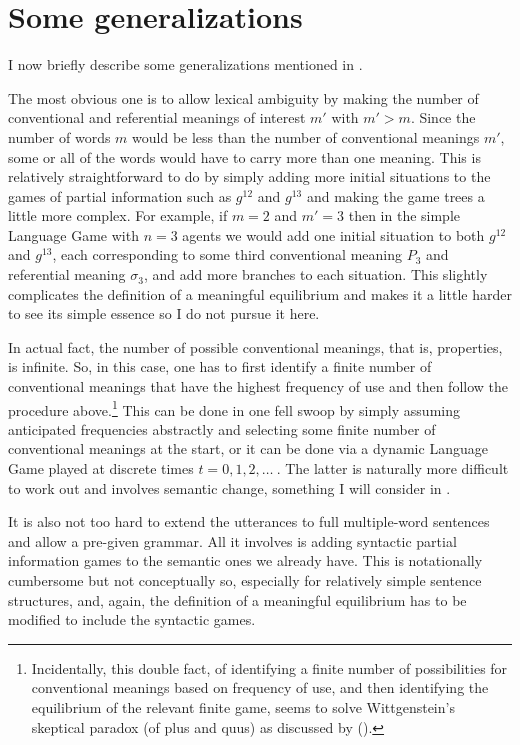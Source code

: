 \section{Some generalizations} \label{sec:some generalizations}

I now briefly describe some generalizations mentioned in . 

The most obvious one is to allow lexical ambiguity by making the number of conventional and referential meanings of interest $m'$ with $m' > m$. Since the number of words $m$ would be less than the number of conventional meanings $m'$, some or all of the words would have to carry more than one meaning. This is relatively straightforward to do by simply adding more initial situations to the games of partial information such as $g^{12}$ and $g^{13}$ and making the game trees a little more complex. For example, if $m = 2$ and $m' = 3$ then in the simple Language Game with $n = 3$ agents we would add one initial situation to both $g^{12}$ and $g^{13}$, each corresponding to some third conventional meaning $P_3$ and referential meaning $\sigma_3$, and add more branches to each situation. This slightly complicates the definition of a meaningful equilibrium and makes it a little harder to see its simple essence so I do not pursue it here.

In actual fact, the number of possible conventional meanings, that is, properties, is infinite. So, in this case, one has to first identify a finite number of conventional meanings that have the highest frequency of use and then follow the procedure above.\footnote{Incidentally, this double fact, of identifying a finite number of possibilities for conventional meanings based on frequency of use, and then identifying the equilibrium of the relevant finite game, seems to solve Wittgenstein’s skeptical paradox (of plus and quus) as discussed by \citeauthor{kripke:w} (\citeyear{kripke:w}).} This can be done in one fell swoop by simply assuming anticipated frequencies abstractly and selecting some finite number of conventional meanings at the start, or it can be done via a dynamic Language Game played at discrete times $t = 0, 1, 2, \ldots\ $. The latter is naturally more difficult to work out and involves semantic change, something I will consider in .

It is also not too hard to extend the utterances to full multiple-word sentences and allow a pre-given grammar. All it involves is adding syntactic partial information games to the semantic ones we already have. This is notationally cumbersome but not conceptually so, especially for relatively simple sentence structures, and, again, the definition of a meaningful equilibrium has to be modified to include the syntactic games.

